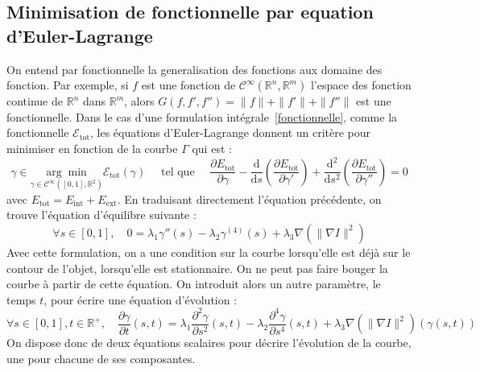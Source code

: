 \documentclass[10pt,a4paper]{article}
\begin{document}
\subsection{Minimisation de fonctionnelle par equation d'Euler-Lagrange}
On entend par fonctionnelle la generalisation des fonctions aux domaine des fonction. Par exemple, si $f$ est une fonction de $\mathcal{C}^\infty(\mathbb{R}^n,\mathbb{R}^m)$ l'espace des fonction continue de $\mathbb{R}^n$ dans $\mathbb{R}^m$, alors $G(f,f',f'')=\|f\|+\|f'\|+\|f''\|$ est une fonctionnelle. Dans le cas d'une formulation int\'{e}grale~\eqref{fonctionnelle}, comme la fonctionnelle $\mathcal{E}_{\text{tot}}$, les \'{e}quations d'Euler-Lagrange donnent un crit\`{e}re pour minimiser en fonction de la courbe $\Gamma$ qui est :
\begin{displaymath}
	\gamma\in\underset{\gamma\in\mathcal{C}^{\infty}([0,1],\mathbb{R}^2)}{\arg\min} \mathcal{E}_{\text{tot}}(\gamma) \quad\text{    tel que     }\quad \frac{\partial E_{\text{tot}}}{\partial \gamma} -\frac{\mathrm{d}}{\mathrm{d}s}\left(\frac{\partial E_{\text{tot}}}{\partial \gamma'}\right) + \frac{\mathrm{d}^2}{\mathrm{d}s^2}\left(\frac{\partial E_{\text{tot}}}{\partial \gamma''}\right) = 0
\end{displaymath}
avec $E_{\text{tot}} = E_{\text{int}} + E_{\text{ext}}$. En traduisant directement l'\'{e}quation pr\'{e}c\'{e}dente, on trouve l'\'{e}quation d'\'{e}quilibre suivante :
\begin{displaymath}
	\forall s\in[0,1],\quad 0 = \lambda_1 \gamma''(s) - \lambda_2 \gamma^{(4)}(s) + \lambda_3 \nabla(\|\nabla I\|^2)
\end{displaymath}
Avec cette formulation, on a une condition sur la courbe lorsqu'elle est d\'{e}j\`{a} sur le contour de l'objet, lorsqu'elle est stationnaire. On ne peut pas faire bouger la courbe \`{a} partir de cette \'{e}quation. On introduit alors un autre param\`{e}tre, le temps $t$, pour \'{e}crire une \'{e}quation d'\'{e}volution : 
\begin{equation}\label{temporelContinu}
	\forall s\in[0,1], t\in\mathbb{R}^{+},\quad \frac{\partial \gamma}{\partial t}(s,t) = \lambda_1 \frac{\partial^2 \gamma}{\partial s^2}(s,t) - \lambda_2 \frac{\partial^4 \gamma}{\partial s^4}(s,t) + \lambda_3 \nabla(\|\nabla I\|^2)(\gamma(s,t))
\end{equation}
On dispose donc de deux \'{e}quations scalaires pour d\'{e}crire l'\'{e}volution de la courbe, une pour chacune de ses composantes.
\end{document}
